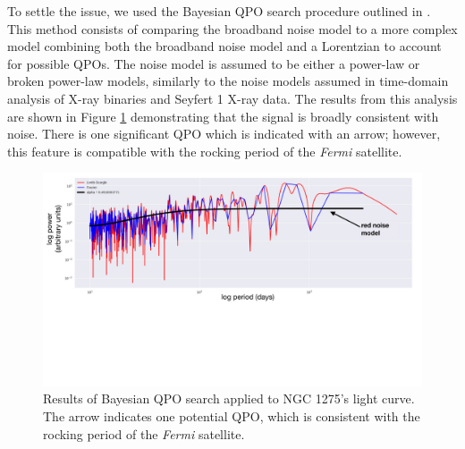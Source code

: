\documentclass{iau}
\begin{document}
To settle the issue, we used the Bayesian QPO search procedure outlined in \cite{Huppenkothen2013}. This method consists of comparing the broadband noise model to a more complex model combining both the broadband noise model and a Lorentzian to account for possible QPOs. The noise model is assumed to be either a power-law or broken power-law models, similarly to the noise models assumed in time-domain analysis of X-ray binaries and Seyfert 1 X-ray data. The results from this analysis are shown in Figure \ref{bayes} demonstrating that the signal is broadly consistent with noise. There is one significant QPO which is indicated with an arrow; however, this feature is compatible with the rocking period of the \textit{Fermi} satellite.

\begin{figure}[h]
\begin{center}
\includegraphics[width=\linewidth, page=2, trim=50 0 50 0,clip=true]{figures/plots.pdf} 
\caption{Results of Bayesian QPO search applied to NGC 1275's light curve. The arrow indicates one potential QPO, which is consistent with the rocking period of the \textit{Fermi} satellite. }
\label{bayes}
\end{center}
\end{figure}
\end{document}
